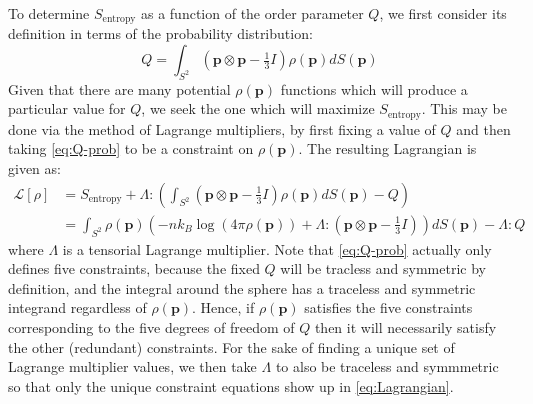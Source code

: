 \documentclass[reqno]{article}
\begin{document}
  To determine $S_\text{entropy}$ as a function of the order parameter $Q$, we first consider
  its definition in terms of the probability distribution:
  \begin{equation} \label{eq:Q-prob}
    Q
    =
    \int_{S^2} \left(\mathbf{p} \otimes \mathbf{p} - \tfrac13 I\right) \rho(\mathbf{p}) dS(\mathbf{p})
  \end{equation}
  Given that there are many potential $\rho(\mathbf{p})$ functions which will produce a
  particular value for $Q$, we seek the one which will maximize $S_\text{entropy}$.
  This may be done via the method of Lagrange multipliers, by first fixing a
  value of $Q$ and then taking \eqref{eq:Q-prob} to be a constraint on $\rho(\mathbf{p})$.
  The resulting Lagrangian is given as:
  \begin{equation} \label{eq:Lagrangian}
    \begin{split}
      \mathcal{L}[\rho]
      &=
      S_\text{entropy} + \Lambda : \left( \int_{S^2} \left(\mathbf{p} \otimes \mathbf{p} - \tfrac13 I\right) \rho(\mathbf{p}) dS(\mathbf{p}) - Q \right) \\
      &=
      \int_{S^2} \rho(\mathbf{p})
      \left( -n k_B \log \left( 4 \pi \rho(\mathbf{p}) \right) + \Lambda : (\mathbf{p} \otimes \mathbf{p} - \tfrac13 I) \right) dS(\mathbf{p}) - \Lambda : Q
    \end{split}
  \end{equation}
  where $\Lambda$ is a tensorial Lagrange multiplier.
  Note that \eqref{eq:Q-prob} actually only defines five constraints, because
  the fixed $Q$ will be tracless and symmetric by definition, and the integral
  around the sphere has a traceless and symmetric integrand regardless of
  $\rho(\mathbf{p})$.
  Hence, if $\rho(\mathbf{p})$ satisfies the five constraints corresponding to the five
  degrees of freedom of $Q$ then it will necessarily satisfy the other
  (redundant) constraints.
  For the sake of finding a unique set of Lagrange multiplier values, we then
  take $\Lambda$ to also be traceless and symmmetric so that only the unique constraint
  equations show up in \eqref{eq:Lagrangian}.
  
\end{document}
